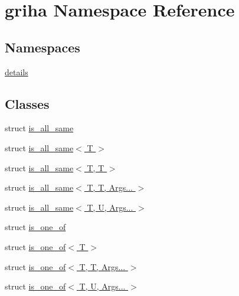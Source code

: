 \hypertarget{namespacegriha}{}\section{griha Namespace Reference}
\label{namespacegriha}
\subsection*{Namespaces}
\begin{DoxyCompactItemize}
\item 
 \hyperlink{namespacegriha_1_1details}{details}
\end{DoxyCompactItemize}
\subsection*{Classes}
\begin{DoxyCompactItemize}
\item 
struct \hyperlink{structgriha_1_1is__all__same}{is\+\_\+all\+\_\+same}
\item 
struct \hyperlink{structgriha_1_1is__all__same_3_01_t_01_4}{is\+\_\+all\+\_\+same$<$ T $>$}
\item 
struct \hyperlink{structgriha_1_1is__all__same_3_01_t_00_01_t_01_4}{is\+\_\+all\+\_\+same$<$ T, T $>$}
\item 
struct \hyperlink{structgriha_1_1is__all__same_3_01_t_00_01_t_00_01_args_8_8_8_01_4}{is\+\_\+all\+\_\+same$<$ T, T, Args... $>$}
\item 
struct \hyperlink{structgriha_1_1is__all__same_3_01_t_00_01_u_00_01_args_8_8_8_01_4}{is\+\_\+all\+\_\+same$<$ T, U, Args... $>$}
\item 
struct \hyperlink{structgriha_1_1is__one__of}{is\+\_\+one\+\_\+of}
\item 
struct \hyperlink{structgriha_1_1is__one__of_3_01_t_01_4}{is\+\_\+one\+\_\+of$<$ T $>$}
\item 
struct \hyperlink{structgriha_1_1is__one__of_3_01_t_00_01_t_00_01_args_8_8_8_01_4}{is\+\_\+one\+\_\+of$<$ T, T, Args... $>$}
\item 
struct \hyperlink{structgriha_1_1is__one__of_3_01_t_00_01_u_00_01_args_8_8_8_01_4}{is\+\_\+one\+\_\+of$<$ T, U, Args... $>$}
\end{DoxyCompactItemize}
